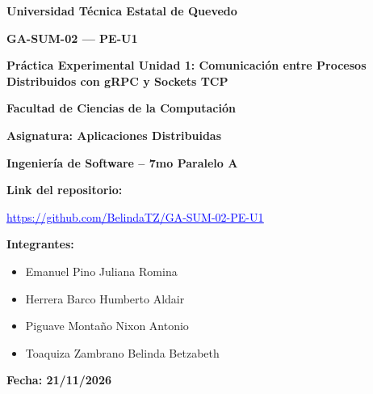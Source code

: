 \thispagestyle{empty}
\begingroup
\centering
\vspace*{0.4cm}
{\Large\bfseries Universidad Técnica Estatal de Quevedo\par}

\vspace{1.2cm}
{\large\bfseries GA-SUM-02 --- PE-U1\par}
\vspace{0.35cm}
{\large\bfseries Práctica Experimental Unidad 1: Comunicación entre
Procesos Distribuidos con gRPC y Sockets TCP\par}

\vspace{1.1cm}
\textbf{Facultad de Ciencias de la Computación}\par
\vspace{0.7cm}
\textbf{Asignatura: Aplicaciones Distribuidas}\par
\vspace{0.7cm}
\textbf{Ingeniería de Software -- 7mo Paralelo A}\par

\vspace{0.8cm}
\textbf{Link del repositorio:}\par
\vspace{0.3cm}
\begingroup
{}
\href{https://github.com/BelindaTZ/GA-SUM-02-PE-U1}{\textcolor{blue}{\large\underline{https://github.com/BelindaTZ/GA-SUM-02-PE-U1}}}\par
\endgroup

\vspace{0.8cm}
\textbf{Integrantes:}\par
\vspace{0.35cm}
\begin{minipage}{0.88\linewidth}
\raggedright
\begin{itemize}
    \setlength{\itemsep}{0.45cm}
    \item Emanuel Pino Juliana Romina
    \item Herrera Barco Humberto Aldair
    \item Piguave Montaño Nixon Antonio
    \item Toaquiza Zambrano Belinda Betzabeth
\end{itemize}
\end{minipage}\par

\vspace{0.7cm}
\textbf{Fecha: 21/11/2026}\par
\endgroup
